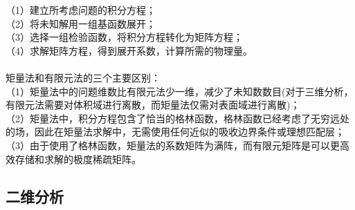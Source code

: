 \documentclass{article}
\numberwithin{equation}{section}
\begin{document}
（1）建立所考虑问题的积分方程；\\
（2）将未知解用一组基函数展开；\\
（3）选择一组检验函数，将积分方程转化为矩阵方程；\\
（4）求解矩阵方程，得到展开系数，计算所需的物理量。\\
\\
矩量法和有限元法的三个主要区别：\\
（1）矩量法中的问题维数比有限元法少一维，减少了未知数数目(对于三维分析，有限元法需要对体积域进行离散，而矩量法仅需对表面域进行离散)；\\
（2）矩量法中，积分方程包含了恰当的格林函数，格林函数已经考虑了无穷远处的场，因此在矩量法求解中，无需使用任何近似的吸收边界条件或理想匹配层；\\
（3）由于使用了格林函数，矩量法的系数矩阵为满阵，而有限元矩阵是可以更高效存储和求解的极度稀疏矩阵。
\subsection{二维分析}
\end{document}
